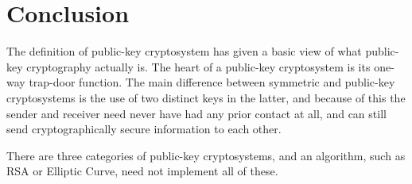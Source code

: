\documentclass[english,titlepage,11pt]{article}
\begin{document}
\section{Conclusion}

The definition of public-key cryptosystem has given a basic view of what public-key cryptography actually is. The heart of a public-key cryptosystem is its one-way trap-door function. The main difference between symmetric and public-key cryptosystems is the use of two distinct keys in the latter, and because of this the sender and receiver need never have had any prior contact at all, and can still send cryptographically secure information to each other.

There are three categories of public-key cryptosystems, and an algorithm, such as RSA or Elliptic Curve, need not implement all of these.
\end{document}
